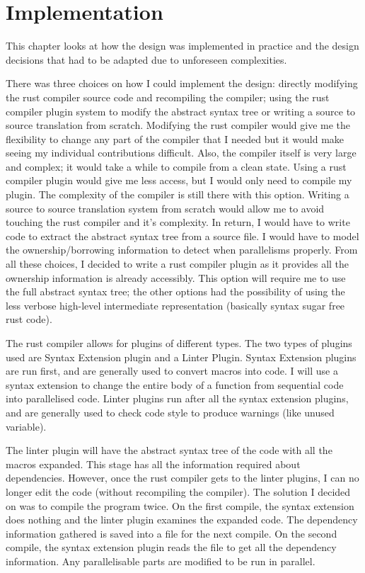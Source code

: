 \chapter{Implementation}

This chapter looks at how the design was implemented in practice and the design decisions that had to be adapted due to unforeseen complexities. 

There was three choices on how I could implement the design: directly modifying the rust compiler source code and recompiling the compiler; using the rust compiler plugin system to modify the abstract syntax tree or writing a source to source translation from scratch. Modifying the rust compiler would give me the flexibility to change any part of the compiler that I needed but it would make seeing my individual contributions difficult. Also, the compiler itself is very large and complex; it would take a while to compile from a clean state. Using a rust compiler plugin would give me less access, but I would only need to compile my plugin. The complexity of the compiler is still there with this option. Writing a source to source translation system from scratch would allow me to avoid touching the rust compiler and it's complexity. In return, I would have to write code to extract the abstract syntax tree from a source file. I would have to model the ownership/borrowing information to detect when parallelisms properly. From all these choices, I decided to write a rust compiler plugin as it provides all the ownership information is already accessibly. This option will require me to use the full abstract syntax tree; the other options had the possibility of using the less verbose high-level intermediate representation (basically syntax sugar free rust code).


The rust compiler allows for plugins of different types. The two types of plugins used are Syntax Extension plugin and a Linter Plugin. Syntax Extension plugins are run first, and are generally used to convert macros into code. I will use a syntax extension to change the entire body of a function from sequential code into parallelised code. Linter plugins run after all the syntax extension plugins, and are generally used to check code style to produce warnings (like unused variable).

The linter plugin will have the abstract syntax tree of the code with all the macros expanded. This stage has all the information required about dependencies. However, once the rust compiler gets to the linter plugins, I can no longer edit the code (without recompiling the compiler). The solution I decided on was to compile the program twice. On the first compile, the syntax extension does nothing and the linter plugin examines the expanded code. The dependency information gathered is saved into a file for the next compile. On the second compile, the syntax extension plugin reads the file to get all the dependency information. Any parallelisable parts are modified to be run in parallel.

